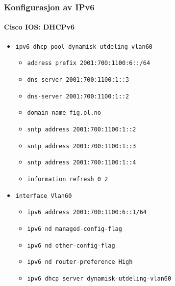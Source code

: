 \begin{frame}%
  \frametitle{Konfigurasjon av IPv6}
  \framesubtitle{Cisco IOS: DHCPv6}
  \begin{itemize}%
  \item \texttt{ipv6 dhcp pool dynamisk-utdeling-vlan60}
    \begin{itemize}%
    \item \texttt{address prefix 2001:700:1100:6::/64}
    \item \texttt{dns-server 2001:700:1100:1::3}
    \item \texttt{dns-server 2001:700:1100:1::2}
    \item \texttt{domain-name fig.ol.no}
    \item \texttt{sntp address 2001:700:1100:1::2}
    \item \texttt{sntp address 2001:700:1100:1::3}
    \item \texttt{sntp address 2001:700:1100:1::4}
    \item \texttt{information refresh 0 2}
    \end{itemize}
  \item \texttt{interface Vlan60}
    \begin{itemize}%
    \item \texttt{ipv6 address 2001:700:1100:6::1/64}
    \item \texttt{ipv6 nd managed-config-flag}
    \item \texttt{ipv6 nd other-config-flag}
    \item \texttt{ipv6 nd router-preference High}
    \item \texttt{ipv6 dhcp server dynamisk-utdeling-vlan60}
    \end{itemize}
  \end{itemize}
\end{frame}

